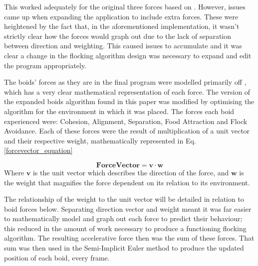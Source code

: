 This worked adequately for the original three forces based on \citet{Reynolds:1987:FHS:37402.37406}. However, issues came up when expanding the application to include extra forces. These were heightened by the fact that, in the aforementioned implementation, it wasn't strictly clear how the forces would graph out due to the lack of separation between direction and weighting. This caused issues to accumulate and it was clear a change in the flocking algorithm design was necessary to expand and edit the program appropriately.


The boids' forces as they are in the final program were modelled primarily off \citet{4604156}, which has a very clear mathematical representation of each force. The version of the expanded boids algorithm found in this paper was modified by optimising the algorithm for the environment in which it was placed. The forces each boid experienced were: Cohesion, Alignment, Separation, Food Attraction and Flock Avoidance. Each of these forces were the result of multiplication of a unit vector and their respective weight, mathematically represented in Eq.\ref{forcevector_equation}


\begin{equation}
\boldsymbol{Force Vector} = \boldsymbol{v} \cdot \boldsymbol{w}
\label{forcevector_equation}
\end{equation}
Where $\boldsymbol{v}$ is the unit vector which describes the direction of the force, and $\boldsymbol{w}$ is the weight that magnifies the force dependent on its relation to its environment.

The relationship of the weight to the unit vector will be detailed in relation to boid forces below. Separating direction vector and weight meant it was far easier to mathematically model and graph out each force to predict their behaviour; this reduced in the amount of work necessary to produce a functioning flocking algorithm. The resulting accelerative force then was the sum of these forces. That sum was then used in the Semi-Implicit Euler method to produce the updated position of each boid, every frame.


